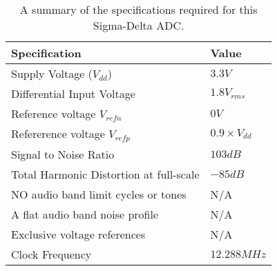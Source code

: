\begin{table}[hb]
    \begin{center}
    \caption{A summary of the specifications required for this Sigma-Delta ADC.}
    \label{tab:SDspec}
    \begin{tabular}{l l} 
        \toprule
        Specification   &   Value  \\
        \midrule
        Supply Voltage ($V_{dd}$)               & $3.3 V$              \\
        Differential Input Voltage              & $1.8 V_{rms}$        \\
        Reference voltage $V_{refn}$            & $ 0 V$               \\
        Refererence voltage $V_{refp}$          & $0.9 \times V_{dd}$  \\
        Signal to Noise Ratio                   & $103 dB$             \\
        Total Harmonic Distortion at full-scale & $-85 dB$             \\
        NO audio band limit cycles or tones     & N/A                  \\
        A flat audio band noise profile         & N/A                  \\
        Exclusive voltage references            & N/A                  \\
        Clock Frequency                         & $12.288 MHz$         \\
        \end{tabular}
    \end{center}
\end{table}
